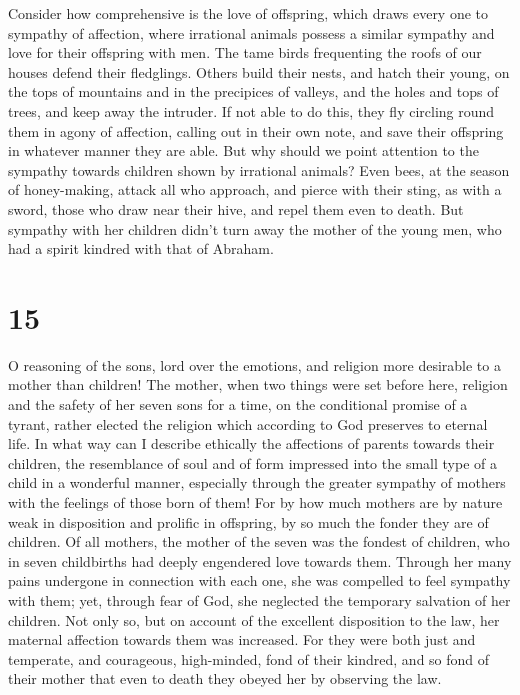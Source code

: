  Consider how comprehensive is the love of offspring, which
draws every one to sympathy of affection,  where irrational
animals possess a similar sympathy and love for their offspring with
men.  The tame birds frequenting the roofs of our houses
defend their fledglings.  Others build their nests, and
hatch their young, on the tops of mountains and in the precipices of
valleys, and the holes and tops of trees, and keep away the intruder.
 If not able to do this, they fly circling round them in
agony of affection, calling out in their own note, and save their
offspring in whatever manner they are able.  But why should
we point attention to the sympathy towards children shown by irrational
animals?  Even bees, at the season of honey-making, attack
all who approach, and pierce with their sting, as with a sword, those
who draw near their hive, and repel them even to death. 
But sympathy with her children didn't turn away the mother of the young
men, who had a spirit kindred with that of Abraham.

\hypertarget{section-14}{%
\section{15}\label{section-14}}

 O reasoning of the sons, lord over the emotions, and
religion more desirable to a mother than children!  The
mother, when two things were set before here, religion and the safety of
her seven sons for a time, on the conditional promise of a tyrant,
 rather elected the religion which according to God
preserves to eternal life.  In what way can I describe
ethically the affections of parents towards their children, the
resemblance of soul and of form impressed into the small type of a child
in a wonderful manner, especially through the greater sympathy of
mothers with the feelings of those born of them!  For by how
much mothers are by nature weak in disposition and prolific in
offspring, by so much the fonder they are of children.  Of
all mothers, the mother of the seven was the fondest of children, who in
seven childbirths had deeply engendered love towards them. 
Through her many pains undergone in connection with each one, she was
compelled to feel sympathy with them;  yet, through fear of
God, she neglected the temporary salvation of her children. 
Not only so, but on account of the excellent disposition to the law, her
maternal affection towards them was increased.  For they
were both just and temperate, and courageous, high-minded, fond of their
kindred, and so fond of their mother that even to death they obeyed her
by observing the law.

